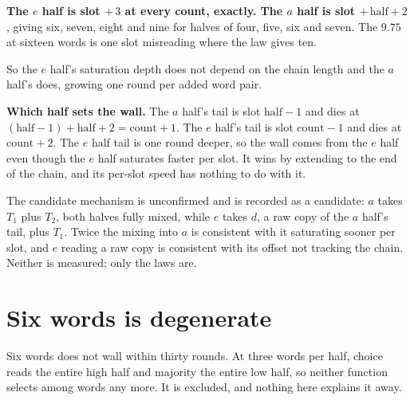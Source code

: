 \textbf{The \(e\) half is slot \(+\,3\) at every count, exactly. The \(a\) half is slot \(+\, \mathrm{half} + 2\)}, giving six, seven, eight and nine for halves of four, five, six and seven. The \(9.75\) at sixteen words is one slot misreading where the law gives ten.

So the \(e\) half's saturation depth does not depend on the chain length and the \(a\) half's does, growing one round per added word pair.

\textbf{Which half sets the wall.} The \(a\) half's tail is slot \(\mathrm{half}-1\) and dies at \((\mathrm{half}-1) + \mathrm{half} + 2 = \mathrm{count} + 1\). The \(e\) half's tail is slot \(\mathrm{count}-1\) and dies at \(\mathrm{count} + 2\). The \(e\) half tail is one round deeper, so the wall comes from the \(e\) half even though the \(e\) half saturates faster per slot. It wins by extending to the end of the chain, and its per-slot speed has nothing to do with it.

The candidate mechanism is unconfirmed and is recorded as a candidate: \(a\) takes \(T_1\) plus \(T_2\), both halves fully mixed, while \(e\) takes \(d\), a raw copy of the \(a\) half's tail, plus \(T_1\). Twice the mixing into \(a\) is consistent with it saturating sooner per slot, and \(e\) reading a raw copy is consistent with its offset not tracking the chain. Neither is measured; only the laws are.

\section{Six words is degenerate}

Six words does not wall within thirty rounds. At three words per half, choice reads the entire high half and majority the entire low half, so neither function selects among words any more. It is excluded, and nothing here explains it away.
